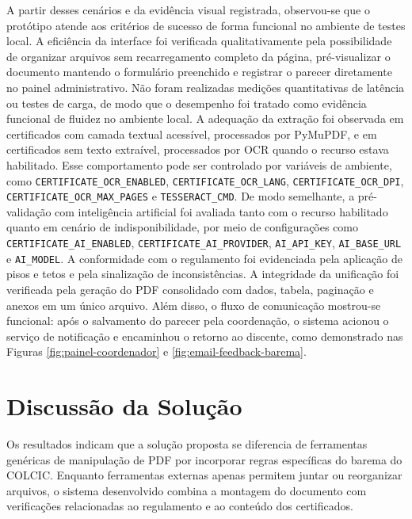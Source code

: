 A partir desses cenários e da evidência visual registrada, observou-se que o protótipo atende aos critérios de sucesso de forma funcional no ambiente de testes local. A eficiência da interface foi verificada qualitativamente pela possibilidade de organizar arquivos sem recarregamento completo da página, pré-visualizar o documento mantendo o formulário preenchido e registrar o parecer diretamente no painel administrativo. Não foram realizadas medições quantitativas de latência ou testes de carga, de modo que o desempenho foi tratado como evidência funcional de fluidez no ambiente local. A adequação da extração foi observada em certificados com camada textual acessível, processados por PyMuPDF, e em certificados sem texto extraível, processados por OCR quando o recurso estava habilitado. Esse comportamento pode ser controlado por variáveis de ambiente, como \texttt{CERTIFICATE\_OCR\_ENABLED}, \texttt{CERTIFICATE\_OCR\_LANG}, \texttt{CERTIFICATE\_OCR\_DPI}, \texttt{CERTIFICATE\_OCR\_MAX\_PAGES} e \texttt{TESSERACT\_CMD}. De modo semelhante, a pré-validação com inteligência artificial foi avaliada tanto com o recurso habilitado quanto em cenário de indisponibilidade, por meio de configurações como \texttt{CERTIFICATE\_AI\_ENABLED}, \texttt{CERTIFICATE\_AI\_PROVIDER}, \texttt{AI\_API\_KEY}, \texttt{AI\_BASE\_URL} e \texttt{AI\_MODEL}. A conformidade com o regulamento foi evidenciada pela aplicação de pisos e tetos e pela sinalização de inconsistências. A integridade da unificação foi verificada pela geração do PDF consolidado com dados, tabela, paginação e anexos em um único arquivo. Além disso, o fluxo de comunicação mostrou-se funcional: após o salvamento do parecer pela coordenação, o sistema acionou o serviço de notificação e encaminhou o retorno ao discente, como demonstrado nas Figuras \ref{fig:painel-coordenador} e \ref{fig:email-feedback-barema}.

\section{Discussão da Solução}

Os resultados indicam que a solução proposta se diferencia de ferramentas genéricas de manipulação de PDF por incorporar regras específicas do barema do COLCIC. Enquanto ferramentas externas apenas permitem juntar ou reorganizar arquivos, o sistema desenvolvido combina a montagem do documento com verificações relacionadas ao regulamento e ao conteúdo dos certificados.

